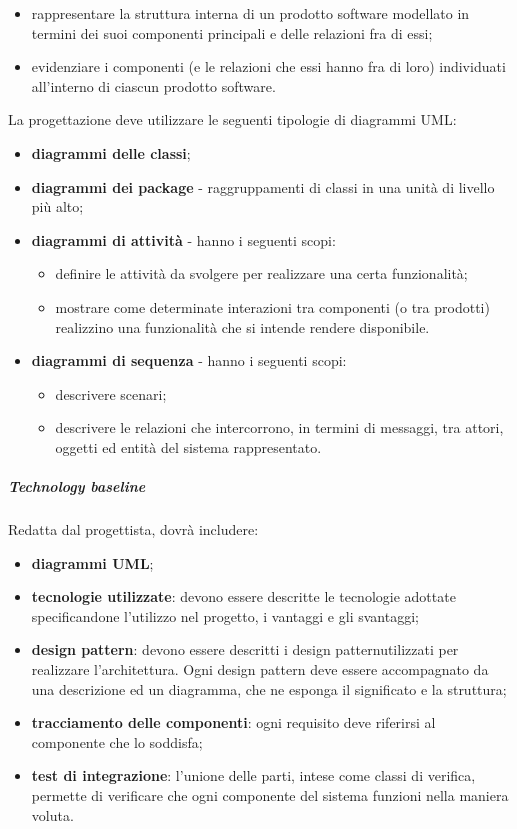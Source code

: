 			\begin{itemize}
				\item rappresentare la struttura interna di un prodotto software modellato in termini dei suoi componenti principali e delle relazioni fra di essi;
				\item evidenziare i componenti (e le relazioni che essi hanno fra di loro)
individuati all'interno di ciascun prodotto software.
			\end{itemize}
			La progettazione deve utilizzare le seguenti tipologie di diagrammi UML:
			\begin{itemize}
				\item \textbf{diagrammi delle classi};
				\item \textbf{diagrammi dei package} - raggruppamenti di classi in una unità di livello più alto;
				\item \textbf{diagrammi di attività} - hanno i seguenti scopi:
					\begin{itemize}
						\item definire le attività da svolgere per realizzare una certa funzionalità;
						\item mostrare come determinate interazioni tra componenti (o tra prodotti) realizzino una funzionalità che si intende rendere disponibile.
					\end{itemize}
				\item \textbf{diagrammi di sequenza} - hanno i seguenti scopi:		
					\begin{itemize}
						\item descrivere scenari;	
						\item descrivere le relazioni che intercorrono, in termini di messaggi, tra attori, oggetti ed entità del sistema rappresentato.
					\end{itemize}						
			\end{itemize}
			\subparagraph{Technology baseline}
			Redatta dal progettista, dovrà includere:
			\begin{itemize}
				\item \textbf{diagrammi UML\glo};
				\item \textbf{tecnologie utilizzate}: devono essere descritte le tecnologie adottate specificandone l'utilizzo nel progetto, i vantaggi e gli svantaggi;
				\item \textbf{design pattern}: devono essere descritti i design pattern\glosp utilizzati per realizzare l'architettura. Ogni design pattern deve essere accompagnato da una descrizione ed un diagramma, che ne esponga il significato e la struttura;
				\item \textbf{tracciamento delle componenti}: ogni requisito deve riferirsi al componente che lo soddisfa;
				\item \textbf{test di integrazione}: l'unione delle parti, intese come classi di verifica, permette di verificare che ogni componente del sistema funzioni nella maniera voluta.
			\end{itemize}
